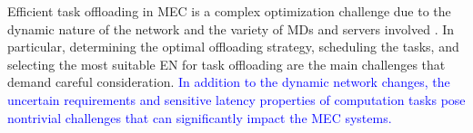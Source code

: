 \documentclass[10pt, journal,letterpaper]{IEEEtran}
\begin{document}
Efficient task offloading in MEC is a complex optimization challenge due to the dynamic nature of the network and the variety of MDs and servers involved \cite{jiang2019toward} \cite{TNSE-WU-24}. In particular, determining the optimal offloading strategy, scheduling the tasks, and selecting the most suitable EN for task offloading are the main challenges that demand careful consideration. \textcolor{blue}{In addition to the dynamic network changes, the uncertain requirements and sensitive latency properties of computation tasks pose nontrivial challenges that can significantly impact the MEC systems.}


\end{document}
